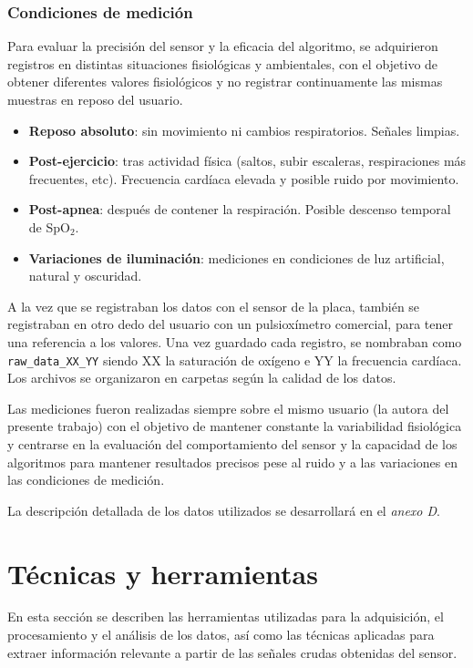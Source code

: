 \subsubsection{Condiciones de medición}

Para evaluar la precisión del sensor y la eficacia del algoritmo, se adquirieron registros en distintas situaciones fisiológicas y ambientales, con el objetivo de obtener diferentes valores fisiológicos y no registrar continuamente las mismas muestras en reposo del usuario.

\begin{itemize}
    \item \textbf{Reposo absoluto}: sin movimiento ni cambios respiratorios. Señales limpias.
    \item \textbf{Post-ejercicio}: tras actividad física (saltos, subir escaleras, respiraciones más frecuentes, etc). Frecuencia cardíaca elevada y posible ruido por movimiento.
    \item \textbf{Post-apnea}: después de contener la respiración. Posible descenso temporal de SpO$_2$.
    \item \textbf{Variaciones de iluminación}: mediciones en condiciones de luz artificial, natural y oscuridad.
\end{itemize}

A la vez que se registraban los datos con el sensor de la placa, también se registraban en otro dedo del usuario con  un pulsioxímetro comercial, para tener una referencia a los valores. Una vez guardado cada registro, se nombraban como \texttt{raw\_data\_XX\_YY} siendo XX la saturación de oxígeno e YY la frecuencia cardíaca. Los archivos se organizaron en carpetas según la calidad de los datos.

Las mediciones fueron realizadas siempre sobre el mismo usuario (la autora del presente trabajo) con el objetivo de mantener constante la variabilidad fisiológica  y centrarse en la evaluación del comportamiento del sensor y la capacidad de los algoritmos para mantener resultados precisos pese al ruido y a las variaciones en las condiciones de medición. 


La descripción detallada de los datos utilizados se desarrollará en el \textit{anexo D}.


\section{Técnicas y herramientas}

En esta sección se describen las herramientas utilizadas para la adquisición, el procesamiento y el análisis de los datos, así como las técnicas aplicadas para extraer información relevante a partir de las señales crudas obtenidas del sensor.

